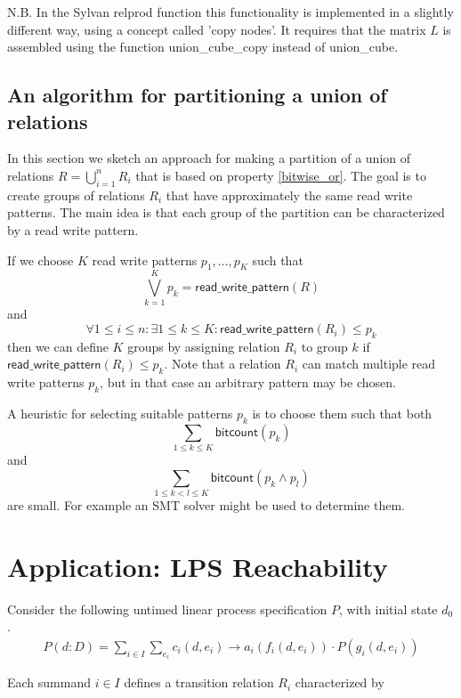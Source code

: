 \documentclass{article}
\begin{document}
N.B. In the Sylvan \textsf{relprod} function this functionality is implemented in a slightly different way, using a concept called 'copy nodes'. It requires that the matrix $L$ is assembled using the function \textsf{union\_cube\_copy} instead of \textsf{union\_cube}.  

\subsection{An algorithm for partitioning a union of relations}
In this section we sketch an approach for making a partition of a union of relations $R = \bigcup_{i=1}^n R_i$ that is based on property \ref{bitwise_or}. The goal is to create groups of relations $R_i$ that have approximately the same read write patterns. The main idea is that each group of the partition can be characterized by a read write pattern.

\vspace{0.5cm}
\noindent
If we choose $K$ read write patterns $p_1, \ldots, p_K$ such that
\[
\bigvee\limits_{k=1}^K p_k = \textsf{read\_write\_pattern}(R)
\]
and
\[
\forall 1 \leq i \leq n: \exists 1 \leq k \leq K: \textsf{read\_write\_pattern}(R_i) \leq p_k
\]
then we can define $K$ groups by assigning relation $R_i$ to group $k$ if $\textsf{read\_write\_pattern}(R_i) \leq p_k$. Note that a
relation $R_i$ can match multiple read write patterns $p_k$, but in that case an arbitrary pattern may be chosen.

\vspace{0.5cm}
\noindent
A heuristic for selecting suitable patterns $p_k$ is to choose them such that both
\[
\sum\limits_{1 \leq k \leq K} \textsf{bitcount}(p_k)
\]
and
\[
\sum\limits_{1 \leq k < l \leq K} \textsf{bitcount}(p_k \land p_l)
\]
are small. For example an SMT solver might be used to determine them.

\newpage
\section{Application: LPS Reachability}
Consider the following untimed linear process specification $P$, with initial state $d_0$.
\[
\begin{array}{l}
P(d: D)=
\sum\limits_{i\in I}\sum\limits_{e_i}c_i(d, e_i)\rightarrow a_i(f_i(d,e_i)) \cdot P(g_i(d,e_i))
\end{array}
\]

\noindent
Each summand $i \in I$ defines a transition relation $R_i$ characterized by
\end{document}
